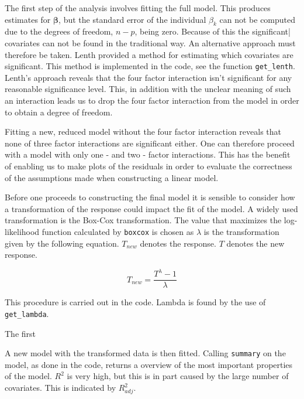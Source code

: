 The first step of the analysis involves fitting the full model. This produces estimates for $\mathbf{\beta}$, but the standard error of the individual ${\beta}_k$ can not be computed due to the degrees of freedom, $n - p$, being zero. Because of this the significant| covariates can not be found in the traditional way. An alternative approach must therefore be taken. Lenth provided a method for estimating which covariates are significant. This method is implemented in the code, see the function \texttt{get_lenth}. Lenth's approach reveals that the four factor interaction isn't significant for any reasonable significance level. This, in addition with the unclear meaning of such an interaction leads us to drop the four factor interaction from the model in order to obtain a degree of freedom. 

Fitting a new, reduced model without the four factor interaction reveals that none of three factor interactions are significant either. One can therefore proceed with a model with only one - and two - factor interactions. This has the benefit of enabling us to make plots of the residuals in order to evaluate the correctness of the assumptions made when constructing a linear model. 

Before one proceeds to constructing the final model it is sensible to consider how a transformation of the response could impact the fit of the model. A widely used transformation is the Box-Cox transformation. The value that maximizes the log-likelihood function calculated by \texttt{boxcox} is chosen as $\lambda$ is the transformation given by the following equation. $T_{new}$ denotes the response. $T$ denotes the new response.

\begin{equation}
T_{new} = \frac{T^{\lambda} - 1}{\lambda}
\end{equation}

This procedure is carried out in the code. Lambda is found by the use of \texttt{get_lambda}.

The first

A new model with the transformed data is then fitted. Calling \texttt{summary} on the model, as done in the code, returns a overview of the most important properties of the model. $R^2$ is very high, but this is in part caused by the large number of covariates. This is indicated by $R^2_{adj}$. 



